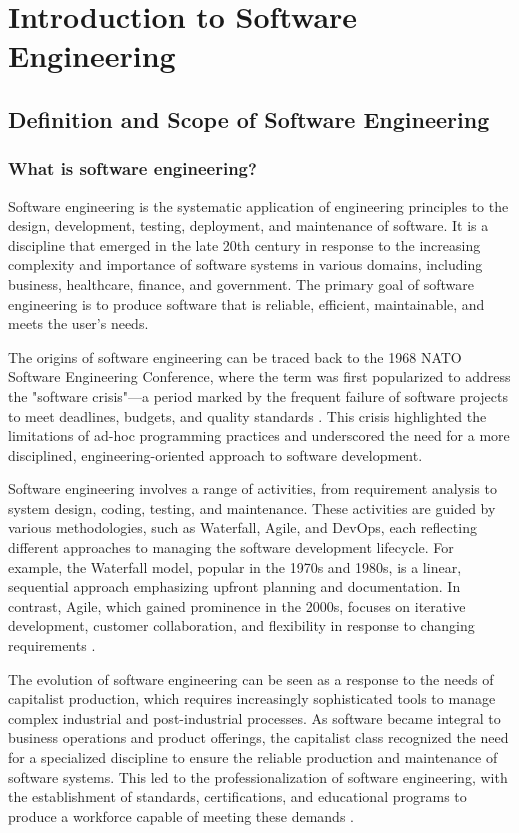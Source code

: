 \chapter{Introduction to Software Engineering}
\begin{refsection}

\section{Definition and Scope of Software Engineering}

\subsection{What is software engineering?}
Software engineering is the systematic application of engineering principles to the design, development, testing, deployment, and maintenance of software. It is a discipline that emerged in the late 20th century in response to the increasing complexity and importance of software systems in various domains, including business, healthcare, finance, and government. The primary goal of software engineering is to produce software that is reliable, efficient, maintainable, and meets the user's needs.

The origins of software engineering can be traced back to the 1968 NATO Software Engineering Conference, where the term was first popularized to address the "software crisis"—a period marked by the frequent failure of software projects to meet deadlines, budgets, and quality standards \cite[pp.~11-13]{nato_report}. This crisis highlighted the limitations of ad-hoc programming practices and underscored the need for a more disciplined, engineering-oriented approach to software development.

Software engineering involves a range of activities, from requirement analysis to system design, coding, testing, and maintenance. These activities are guided by various methodologies, such as Waterfall, Agile, and DevOps, each reflecting different approaches to managing the software development lifecycle. For example, the Waterfall model, popular in the 1970s and 1980s, is a linear, sequential approach emphasizing upfront planning and documentation. In contrast, Agile, which gained prominence in the 2000s, focuses on iterative development, customer collaboration, and flexibility in response to changing requirements \cite[pp.~45-47]{humphrey_1995}.

The evolution of software engineering can be seen as a response to the needs of capitalist production, which requires increasingly sophisticated tools to manage complex industrial and post-industrial processes. As software became integral to business operations and product offerings, the capitalist class recognized the need for a specialized discipline to ensure the reliable production and maintenance of software systems. This led to the professionalization of software engineering, with the establishment of standards, certifications, and educational programs to produce a workforce capable of meeting these demands \cite[pp.~22-25]{pressman_software}.


\end{refsection}
